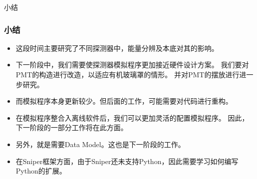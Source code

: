 
\begin{frame}
    \begin{center}
        \LARGE 小结
    \end{center}
\end{frame}

\begin{frame}
    \frametitle{小结}
    \begin{itemize}
        \item 这段时间主要研究了不同探测器中，能量分辨及本底对其的影响。
        \item 下一阶段中，我们需要使探测器模拟程序更加接近硬件设计方案。
              我们要对PMT的构造进行改造，以适应有机玻璃罩的情形。
              并对PMT的摆放进行进一步研究。
        \item 而模拟程序本身更新较少。但后面的工作，可能需要对代码进行重构。
        \item 在模拟程序整合入离线软件后，我们可以更加灵活的配置模拟程序。
              因此，下一阶段的一部分工作将在此方面。
        \item 另外，就是需要Data Model。这也是下一阶段的工作。
        \item 在Sniper框架方面，由于Sniper还未支持Python，因此需要学习如何编写
              Python的扩展。
    \end{itemize}
\end{frame}

